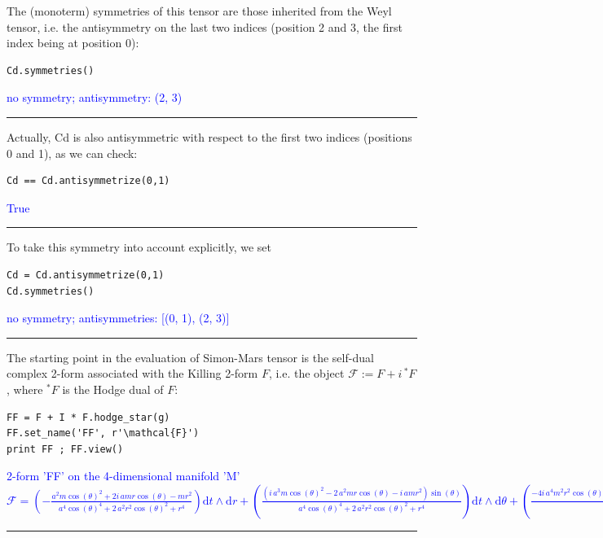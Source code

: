 \documentclass[a4paper]{jpconf}
\newcommand{\soutput}[1]{\textcolor{blue}{#1}\\[-0.8ex]\rule{\textwidth}{0.4pt}}
\begin{document}
The (monoterm) symmetries of this tensor are those inherited from the
Weyl tensor, i.e. the antisymmetry on the last two indices (position 2 and 3, the first index being at position 0):
\begin{verbatim}
Cd.symmetries()
\end{verbatim}
\soutput{no symmetry;  antisymmetry: (2, 3)}
Actually, Cd is also antisymmetric with respect to the first two indices (positions 0 and 1), as we can check:
\begin{verbatim}
Cd == Cd.antisymmetrize(0,1)
\end{verbatim}
\soutput{True}
To take this symmetry into account explicitly, we set
\begin{verbatim}
Cd = Cd.antisymmetrize(0,1)
Cd.symmetries()
\end{verbatim}
\soutput{no symmetry;  antisymmetries: [(0, 1), (2, 3)]}
The starting point in the evaluation of Simon-Mars tensor is the
self-dual complex 2-form associated with the Killing 2-form $F$, i.e. the object $\mathcal{F} := F + i \, {}^* F$, where ${}^*F$ is the Hodge dual of $F$:
\begin{verbatim}
FF = F + I * F.hodge_star(g)
FF.set_name('FF', r'\mathcal{F}')
print FF ; FF.view()
\end{verbatim}
\soutput{2-form 'FF' on the 4-dimensional manifold 'M'\\
$\mathcal{F} = \left( -\frac{a^{2} m \cos\left(\theta\right)^{2} + 2 i \,
a m r \cos\left(\theta\right) - m r^{2}}{a^{4}
\cos\left(\theta\right)^{4} + 2 \, a^{2} r^{2}
\cos\left(\theta\right)^{2} + r^{4}} \right) \mathrm{d} t\wedge
\mathrm{d} r + \left( \frac{{\left(i \, a^{3} m
\cos\left(\theta\right)^{2} - 2 \, a^{2} m r \cos\left(\theta\right) - i
\, a m r^{2}\right)} \sin\left(\theta\right)}{a^{4}
\cos\left(\theta\right)^{4} + 2 \, a^{2} r^{2}
\cos\left(\theta\right)^{2} + r^{4}} \right) \mathrm{d} t\wedge
\mathrm{d} \theta + \left( \frac{-4 i \, a^{4} m^{2} r^{2}
\cos\left(\theta\right) \sin\left(\theta\right)^{4} + {\left(a^{3} m
r^{4} - 2 \, a m^{2} r^{5} + a m r^{6} - {\left(a^{7} m - 2 \, a^{5}
m^{2} r + a^{5} m r^{2}\right)} \cos\left(\theta\right)^{4} - {\left(2 i
\, a^{6} m r + 2 i \, a^{4} m r^{3}\right)} \cos\left(\theta\right)^{3}
- {\left(-4 i \, a^{4} m^{2} r^{2} + 2 i \, a^{4} m r^{3} - 4 i \, a^{2}
m^{2} r^{4} + 2 i \, a^{2} m r^{5}\right)}
\cos\left(\theta\right)\right)} \sin\left(\theta\right)^{2}}{a^{2} r^{6}
- 2 \, m r^{7} + r^{8} + {\left(a^{8} - 2 \, a^{6} m r + a^{6}
r^{2}\right)} \cos\left(\theta\right)^{6} + 3 \, {\left(a^{6} r^{2} - 2
\, a^{4} m r^{3} + a^{4} r^{4}\right)} \cos\left(\theta\right)^{4} + 3
\, {\left(a^{4} r^{4} - 2 \, a^{2} m r^{5} + a^{2} r^{6}\right)}
\cos\left(\theta\right)^{2}} \right) \mathrm{d} r\wedge \mathrm{d} \phi
+ \left( -\frac{{\left(i \, a^{4} m + i \, a^{2} m r^{2}\right)}
\sin\left(\theta\right)^{3} + {\left(-i \, a^{4} m + i \, m r^{4} + 2 \,
{\left(a^{3} m r + a m r^{3}\right)} \cos\left(\theta\right)\right)}
\sin\left(\theta\right)}{a^{4} \cos\left(\theta\right)^{4} + 2 \, a^{2}
r^{2} \cos\left(\theta\right)^{2} + r^{4}} \right) \mathrm{d}
\theta\wedge \mathrm{d} \phi$}
\end{document}
